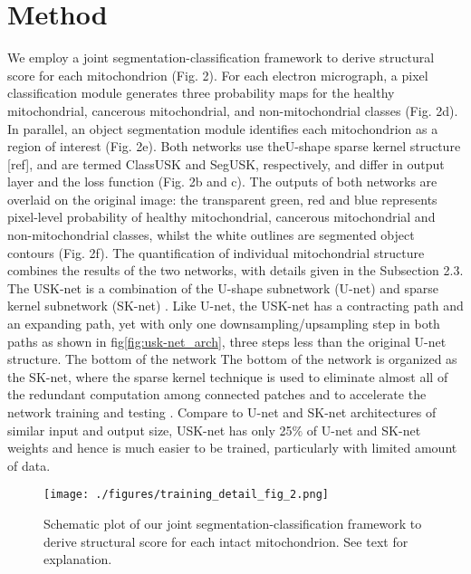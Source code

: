 \chapter{Method}\label{chapter:method}


\label{sec:method}
We employ a joint segmentation-classification framework to derive structural score
for each mitochondrion (Fig. 2). For each electron micrograph, a pixel classification
module generates three probability maps for the healthy mitochondrial, cancerous
mitochondrial, and non-mitochondrial classes (Fig. 2d). In parallel, an object
segmentation module identifies each mitochondrion as a region of interest (Fig. 2e).
Both networks use theU-shape sparse kernel structure [ref], and are termed ClassUSK
and SegUSK, respectively, and differ in output layer and the loss function (Fig. 2b
and c). The outputs of both networks are overlaid on the original image: the
transparent green, red and blue represents pixel-level probability of healthy
mitochondrial, cancerous mitochondrial and non-mitochondrial classes, whilst the white outlines are segmented object contours (Fig. 2f). The quantification of individual mitochondrial structure combines the results of the two networks, with details given
in the Subsection 2.3.
The USK-net is a combination of the U-shape subnetwork (U-net) \cite{DBLP:conf/miccai/RonnebergerFB15} and sparse
kernel subnetwork (SK-net) \cite{DBLP:journals/corr/LiZW14}. Like U-net, the USK-net has a contracting path and
an expanding path, yet with only one downsampling/upsampling step in both paths
 as shown in fig\ref{fig:usk-net_arch}, three steps less than the original U-net structure. The bottom of the network
The bottom of the network is organized as the SK-net, where the sparse kernel technique is used 
to eliminate
almost all of the redundant computation among connected patches and to accelerate
the network training and testing \cite{DBLP:journals/corr/LiZW14}. Compare to U-net and SK-net architectures of
similar input and output size, USK-net has only 25$ \%$ of U-net and SK-net weights
and hence is much easier to be trained, particularly with limited amount of data.
\begin{figure}[ht!]
\centering 
\texttt{[image: ./figures/training\_detail\_fig\_2.png]}
\caption{Schematic plot of our joint segmentation-classification framework to derive structural score for each intact mitochondrion. See text for explanation. }
\label{fig:schematic_seg_classification}
\end{figure}



